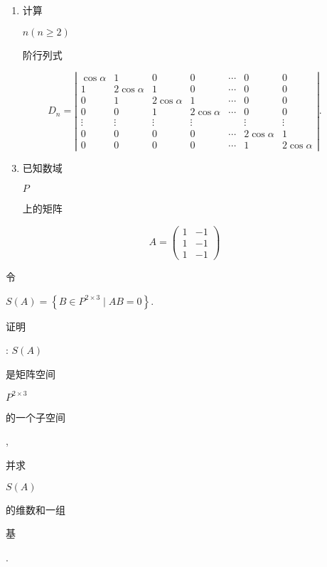 \documentclass[10pt]{article}
\begin{document}
\begin{enumerate}
  \item \begin{CJK}{UTF8}{mj}计算\end{CJK} $n(n \geqslant 2)$ \begin{CJK}{UTF8}{mj}阶行列式\end{CJK}
\end{enumerate}
$$
D_{n}=\left|\begin{array}{ccccccc}
\cos \alpha & 1 & 0 & 0 & \cdots & 0 & 0 \\
1 & 2 \cos \alpha & 1 & 0 & \cdots & 0 & 0 \\
0 & 1 & 2 \cos \alpha & 1 & \cdots & 0 & 0 \\
0 & 0 & 1 & 2 \cos \alpha & \cdots & 0 & 0 \\
\vdots & \vdots & \vdots & \vdots & & \vdots & \vdots \\
0 & 0 & 0 & 0 & \cdots & 2 \cos \alpha & 1 \\
0 & 0 & 0 & 0 & \cdots & 1 & 2 \cos \alpha
\end{array}\right| .
$$

\begin{enumerate}
  \setcounter{enumi}{2}
  \item \begin{CJK}{UTF8}{mj}已知数域\end{CJK} $P$ \begin{CJK}{UTF8}{mj}上的矩阵\end{CJK}
\end{enumerate}
$$
A=\left(\begin{array}{rr}
1 & -1 \\
1 & -1 \\
1 & -1
\end{array}\right)
$$
\begin{CJK}{UTF8}{mj}令\end{CJK} $S(A)=\left\{B \in P^{2 \times 3} \mid A B=0\right\}$. \begin{CJK}{UTF8}{mj}证明\end{CJK}: $S(A)$ \begin{CJK}{UTF8}{mj}是矩阵空间\end{CJK} $P^{2 \times 3}$ \begin{CJK}{UTF8}{mj}的一个子空间\end{CJK}, \begin{CJK}{UTF8}{mj}并求\end{CJK} $S(A)$ \begin{CJK}{UTF8}{mj}的维数和一组\end{CJK} \begin{CJK}{UTF8}{mj}基\end{CJK}.
\end{document}
